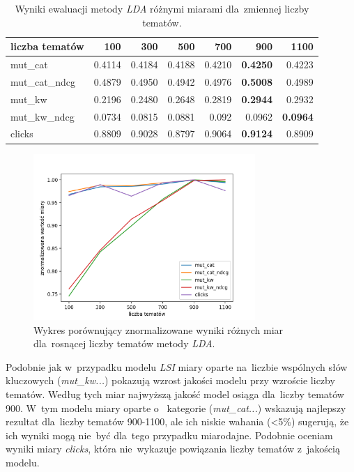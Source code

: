 \documentclass[pl]{minipw} %
\begin{document}
\begin{table}[H]
	\centering
	\begin{tabular}{lrrrrrr}
		\hline
		liczba tematów &       100 &       300 &       500 &       700 &       900 &      1100 \\
		\hline
		mut\_cat      & 0.4114 & 0.4184 & 0.4188 & 0.4210  & \textbf{0.4250}  & 0.4223 \\
		mut\_cat\_ndcg & 0.4879 & 0.4950  & 0.4942 & 0.4976 & \textbf{0.5008} & 0.4989 \\
		mut\_kw       & 0.2196 & 0.2480  & 0.2648 & 0.2819 & \textbf{0.2944} & 0.2932 \\
		mut\_kw\_ndcg  & 0.0734 & 0.0815 & 0.0881 & 0.092  & 0.0962 & \textbf{0.0964} \\
		clicks       & 0.8809 & 0.9028 & 0.8797 & 0.9064 & \textbf{0.9124} & 0.8909 \\
		\hline
	\end{tabular}
	\caption{Wyniki ewaluacji metody \textit{LDA} różnymi miarami dla~zmiennej liczby tematów.}
\end{table}

\begin{figure}[H]
	\centering
	\includegraphics[width=0.75\textwidth]{img/results/lda_.png}
	\caption{Wykres porównujący znormalizowane wyniki różnych miar dla~rosnącej liczby tematów metody \textit{LDA}.}
\end{figure}

Podobnie jak w~przypadku modelu \textit{LSI} miary oparte na~liczbie wspólnych słów kluczowych (\textit{mut\_kw...}) pokazują wzrost jakości modelu przy wzroście liczby tematów. Według tych miar najwyższą jakość model osiąga dla~liczby tematów 900. W~tym modelu miary oparte o~ kategorie (\textit{mut\_cat...}) wskazują najlepszy rezultat dla~liczby tematów 900-1100, ale ich niskie wahania (<5\%) sugerują, że ich wyniki mogą nie~być dla~tego przypadku miarodajne. Podobnie oceniam wyniki miary \textit{clicks}, która nie~wykazuje powiązania liczby tematów z~jakością modelu.
\end{document}
